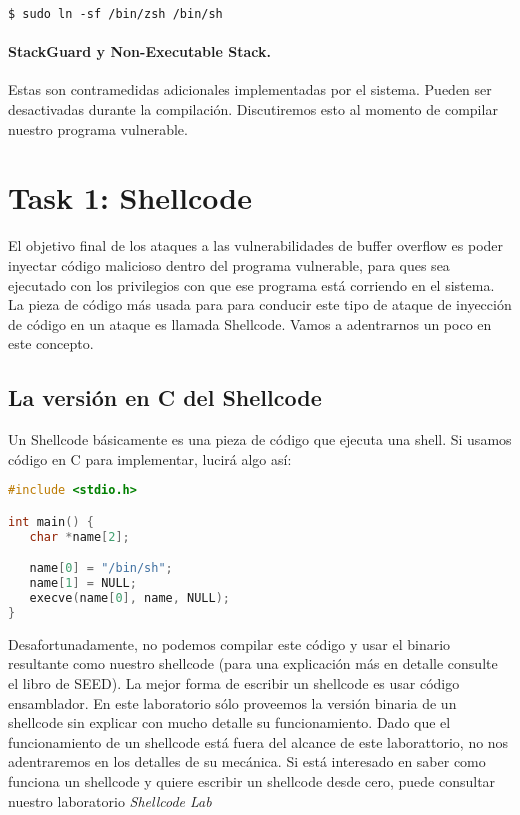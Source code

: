 \begin{lstlisting}
$ sudo ln -sf /bin/zsh /bin/sh
\end{lstlisting}


\paragraph{StackGuard y Non-Executable Stack.} Estas son contramedidas adicionales implementadas por el sistema. Pueden ser desactivadas durante la compilación.
Discutiremos esto al momento de compilar nuestro programa vulnerable.



\section{Task 1: Shellcode}

El objetivo final de los ataques a las vulnerabilidades de buffer overflow es poder inyectar código malicioso dentro del programa vulnerable, para ques sea ejecutado con los privilegios con que ese programa está corriendo en el sistema.
La pieza de código más usada para para conducir este tipo de ataque de inyección de código en un ataque es llamada Shellcode.
Vamos a adentrarnos un poco en este concepto.


\subsection{La versión en C del Shellcode} 

Un Shellcode básicamente es una pieza de código que ejecuta una shell.
Si usamos código en C para implementar, lucirá algo así:

\begin{lstlisting}[language=C]
#include <stdio.h>

int main() {
   char *name[2];

   name[0] = "/bin/sh";
   name[1] = NULL;
   execve(name[0], name, NULL);
}
\end{lstlisting}
 
Desafortunadamente, no podemos compilar este código y usar el binario resultante como nuestro shellcode (para una explicación más en detalle consulte el libro de SEED).
La mejor forma de escribir un shellcode es usar código ensamblador.
En este laboratorio sólo proveemos la versión binaria de un shellcode sin explicar con mucho detalle su funcionamiento. Dado que el funcionamiento de un shellcode está fuera del alcance de este laborattorio, no nos adentraremos en los detalles de su mecánica.
Si está interesado en saber como funciona un shellcode y quiere escribir un shellcode desde cero, puede consultar nuestro laboratorio \textit{Shellcode Lab}


